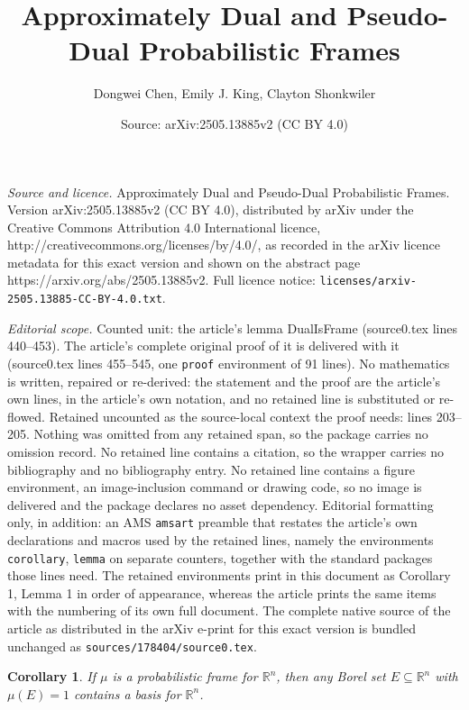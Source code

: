 \documentclass[10pt,a4paper]{amsart}
\title{Approximately Dual and Pseudo-Dual Probabilistic Frames}
\author{Dongwei Chen, Emily J. King, Clayton Shonkwiler}
\date{Source: arXiv:2505.13885v2 (CC BY 4.0)}
\newtheorem{corollary}{Corollary}
\newcommand\R{{\mathbb R}}
\begin{document}
\maketitle

\noindent\emph{Source and licence.} Approximately Dual and Pseudo-Dual Probabilistic Frames. Version arXiv:2505.13885v2 (CC BY 4.0), distributed by arXiv under the Creative Commons Attribution 4.0 International licence, http://creativecommons.org/licenses/by/4.0/, as recorded in the arXiv licence metadata for this exact version and shown on the abstract page https://arxiv.org/abs/2505.13885v2. Full licence notice: \texttt{licenses/arxiv-2505.13885-CC-BY-4.0.txt}.\par\smallskip

\noindent\textit{Editorial scope.} Counted unit: the article's lemma DualIsFrame (source0.tex lines 440--453). The article's complete original proof of it is delivered with it (source0.tex lines 455--545, one \texttt{proof} environment of 91 lines). No mathematics is written, repaired or re-derived: the statement and the proof are the article's own lines, in the article's own notation, and no retained line is substituted or re-flowed.  Retained uncounted as the source-local context the proof needs: lines 203--205.  Nothing was omitted from any retained span, so the package carries no omission record.  No retained line contains a citation, so the wrapper carries no bibliography and no bibliography entry.  No retained line contains a figure environment, an image-inclusion command or drawing code, so no image is delivered and the package declares no asset dependency.  Editorial formatting only, in addition: an AMS \texttt{amsart} preamble that restates the article's own declarations and macros used by the retained lines, namely the environments \texttt{corollary}, \texttt{lemma} on separate counters, together with the standard packages those lines need.  The retained environments print in this document as Corollary 1, Lemma 1 in order of appearance, whereas the article prints the same items with the numbering of its own full document.  The complete native source of the article as distributed in the arXiv e-print for this exact version is bundled unchanged as \texttt{sources/178404/source0.tex}.
\begin{corollary}\label{cor:full measure contains basis}
    If $\mu$ is a probabilistic frame for $\R^n$, then any Borel set $E \subseteq \R^n$ with $\mu(E) = 1$ contains a basis for $\R^n$.
\end{corollary}
\end{document}
